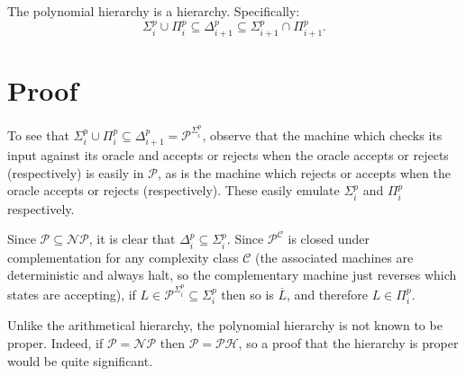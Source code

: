 \documentclass[12pt]{article}
\begin{document}
The polynomial hierarchy is a hierarchy.  Specifically: \[\Sigma^p_i\cup\Pi^p_i\subseteq\Delta^p_{i+1}\subseteq\Sigma^p_{i+1}\cap\Pi^p_{i+1}.\]

\section*{Proof}

To see that $\Sigma^p_i\cup\Pi^p_i\subseteq\Delta^p_{i+1}=\mathcal{P}^{\Sigma^p_i}$, 
observe that the machine which checks its input against its oracle and accepts or rejects when the oracle accepts or rejects (respectively) is easily in $\mathcal{P}$, as is the machine which rejects or accepts when the oracle accepts or rejects (respectively).  These easily emulate $\Sigma^p_i$ and $\Pi^p_i$ respectively.

Since $\mathcal{P}\subseteq\mathcal{NP}$, it is clear that 
$\Delta^p_i\subseteq\Sigma^p_i$.  Since $\mathcal{P}^{\mathcal{C}}$ is 
closed 
under complementation for any 
complexity class 
$\mathcal{C}$ (the associated 
machines are deterministic and always halt, so the complementary machine just 
reverses which states are accepting), if 
$L\in\mathcal{P}^{\Sigma^p_i}\subseteq\Sigma^p_i$ then so is $\overline{L}$, 
and therefore $L\in\Pi^p_i$.



Unlike the arithmetical hierarchy, the polynomial hierarchy is not known to be proper.  Indeed, if $\mathcal{P}=\mathcal{NP}$ then $\mathcal{P}=\mathcal{PH}$, so a proof that the hierarchy is proper would be quite significant.
\end{document}

